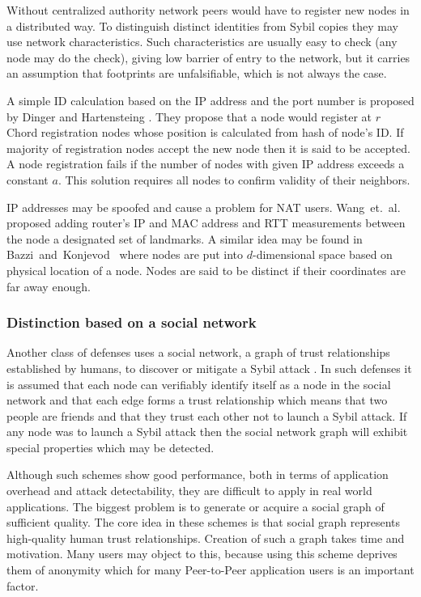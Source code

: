  Without centralized authority network peers would have to register new nodes
  in a distributed way. To distinguish distinct identities from Sybil copies
  they may use network characteristics.
  Such characteristics are usually easy to check (any node may do the check),
  giving low barrier of entry to the network, but it carries an
  assumption that footprints are unfalsifiable, which is not always the case.

  A simple ID calculation based on the IP address and the port number is
  proposed by Dinger and Hartensteing \cite{din06}.
  They propose that a node would register at $r$ Chord registration nodes whose
  position is calculated from hash of node's ID.
  If majority of registration nodes accept the new node then
  it is said to be accepted.
  A node registration fails if the number of nodes with given IP address exceeds
  a constant $a$.
  This solution requires all nodes to confirm validity of their neighbors.

  IP addresses may be spoofed and cause a problem for NAT users.
  Wang~et.~al.~\cite{wan05} proposed adding router's IP and MAC address
  and RTT measurements between the node a designated set of landmarks. A similar
  idea may be found in Bazzi~and~Konjevod~\cite{baz05} where nodes are put
  into $d$-dimensional space based on physical location of a node. Nodes are
  said to be distinct if their coordinates are far away enough.

  \subsubsection{Distinction based on a social network}

  Another class of defenses uses a social network, a graph of trust
  relationships established by humans, to discover or mitigate a Sybil attack
  \cite{urd11}.
  In such defenses it is assumed that each node can verifiably identify itself
  as a node in the social network and that each edge forms a trust relationship
  which means that two people are friends and that they trust each other not to
  launch a Sybil attack. If any node was to launch a Sybil attack then the
  social network graph will exhibit special properties which may be detected. 

  Although such schemes show good performance, both in terms of application
  overhead and attack detectability, they are difficult to apply in real world
  applications. The biggest problem is to generate or acquire a social graph of
  sufficient quality. The core idea in these schemes is that social graph
  represents high-quality human trust relationships. Creation of such a graph
  takes time and motivation. Many users may object to this, because using this
  scheme deprives them of anonymity which for many Peer-to-Peer application
  users is an important factor.

